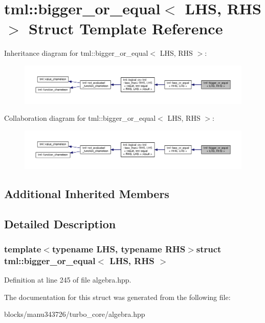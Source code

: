 \hypertarget{structtml_1_1bigger__or__equal}{\section{tml\+:\+:bigger\+\_\+or\+\_\+equal$<$ L\+H\+S, R\+H\+S $>$ Struct Template Reference}
\label{structtml_1_1bigger__or__equal}
}


Inheritance diagram for tml\+:\+:bigger\+\_\+or\+\_\+equal$<$ L\+H\+S, R\+H\+S $>$\+:
\nopagebreak
\begin{figure}[H]
\begin{center}
\leavevmode
\includegraphics[width=350pt]{structtml_1_1bigger__or__equal__inherit__graph}
\end{center}
\end{figure}


Collaboration diagram for tml\+:\+:bigger\+\_\+or\+\_\+equal$<$ L\+H\+S, R\+H\+S $>$\+:
\nopagebreak
\begin{figure}[H]
\begin{center}
\leavevmode
\includegraphics[width=350pt]{structtml_1_1bigger__or__equal__coll__graph}
\end{center}
\end{figure}
\subsection*{Additional Inherited Members}


\subsection{Detailed Description}
\subsubsection*{template$<$typename L\+H\+S, typename R\+H\+S$>$struct tml\+::bigger\+\_\+or\+\_\+equal$<$ L\+H\+S, R\+H\+S $>$}



Definition at line 245 of file algebra.\+hpp.



The documentation for this struct was generated from the following file\+:\begin{DoxyCompactItemize}
\item 
blocks/manu343726/turbo\+\_\+core/algebra.\+hpp\end{DoxyCompactItemize}
